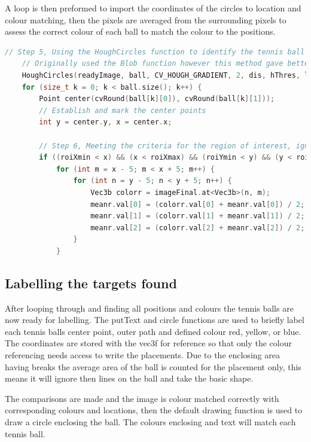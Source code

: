 \documentclass[a4paper, 10pt]{article}
\begin{document}
A loop is then preformed to import the coordinates of the circles to location and colour matching, then the pixels are averaged from the surrounding pixels to assess the correct colour of each ball to match the colour to the positions.

\begin{lstlisting}[language = C++]
	// Step 5, Using the HoughCircles function to identify the tennis ball radius
	// Originally used the Blob function however this method gave better results
	HoughCircles(readyImage, ball, CV_HOUGH_GRADIENT, 2, dis, hThres, lThres, minRad, maxRad);
	for (size_t k = 0; k < ball.size(); k++) {
		Point center(cvRound(ball[k][0]), cvRound(ball[k][1]));
		// Establish and mark the center points
		int y = center.y, x = center.x;
		
		// Step 6, Meeting the criteria for the region of interest, ignore rest
		if ((roiXmin < x) && (x < roiXmax) && (roiYmin < y) && (y < roiYmax)) {
			for (int m = x - 5; m < x + 5; m++) {
				for (int n = y - 5; n < y + 5; n++) {
					Vec3b colorr = imageFinal.at<Vec3b>(n, m);
					meanr.val[0] = (colorr.val[0] + meanr.val[0]) / 2;
					meanr.val[1] = (colorr.val[1] + meanr.val[1]) / 2;
					meanr.val[2] = (colorr.val[2] + meanr.val[2]) / 2;
				}
			}
\end{lstlisting}

\clearpage
\subsection{Labelling the targets found}

After looping through and finding all positions and colours the tennis balls are now ready for labelling. The putText and circle functions are used to briefly label each tennis balls center point, outer path and defined colour red, yellow, or blue. The coordinates are stored with the vec3f for reference so that only the colour referencing needs access to write the placements. Due to the enclosing area having breaks the average area of the ball is counted for the placement only, this means it will ignore then lines on the ball and take the basic shape.

The comparisons are made and the image is colour matched correctly with corresponding colours and locations, then the default drawing function is used to draw a circle enclosing the ball. The colours enclosing and text will match each tennis ball.
\end{document}
